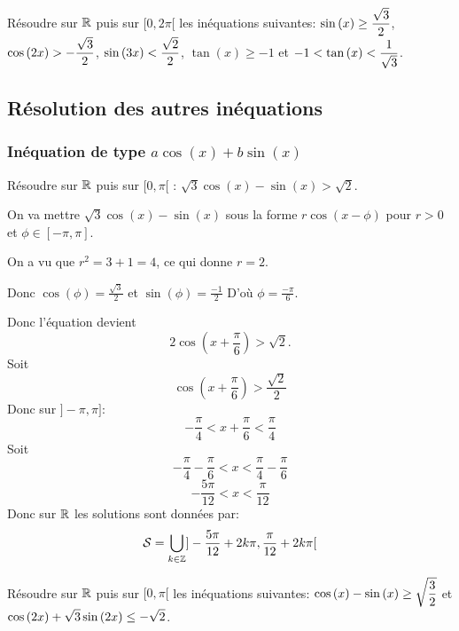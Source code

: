 \documentclass[a4paper, 11pt]{article}
\begin{document}
{\footnotesize
\begin{exo} R\'esoudre sur $\mathbb{R}$ puis sur $\lbrack 0,2\pi\lbrack$ les in\'equations suivantes:  $\displaystyle \sin{(x)}\geq \frac{\sqrt{3}}{2}$, $\displaystyle \cos{(2x)}>-\frac{\sqrt{3}}{2}$, $\displaystyle \sin{(3x)}<\frac{\sqrt{2}}{2}$, $\tan{(x)}\geq -1$ et $\displaystyle -1<\tan{(x)}<\frac{1}{\sqrt{3}}$.
\end{exo}}


\subsection{R\'esolution des autres in\'equations}


\subsubsection{In\'equation de type $a\cos{(x)}+b\sin{(x)}$}

\begin{exemple}
R\'esoudre sur $\mathbb{R}$ puis sur $\lbrack 0,\pi\lbrack$ : $\sqrt{3}\cos{(x)}-\sin{(x)}>\sqrt{2}$.

\end{exemple}
\begin{cor}
On va mettre $\sqrt{3}\cos{(x)}-\sin{(x)}$ sous la forme $r\cos(x-\phi)$ pour $r>0$ et $\phi\in [-\pi,\pi]$. 

On a vu que $r^2= 3+1=4$, ce qui donne $r=2$. 

Donc $\cos(\phi) =\frac{\sqrt{3}}{2}$ et $\sin(\phi) = \frac{-1}{2} $ 
D'où $\phi=\frac{-\pi}{6}$.

Donc l'équation devient $$2 \cos(x+\frac{\pi}{6}) >\sqrt{2}.$$
Soit 
$$\cos(x+\frac{\pi}{6}) >\frac{\sqrt{2}}{2}$$
Donc  sur $]-\pi, \pi]$:
$$-\frac{\pi}{4}< x+\frac{\pi}{6} <\frac{\pi}{4}$$
Soit 
$$-\frac{\pi}{4}-\frac{\pi}{6} < x <\frac{\pi}{4}-\frac{\pi}{6} $$
$$-\frac{5\pi}{12} < x <\frac{\pi}{12} $$
Donc sur $\mathbb{R}$ les solutions sont données par:
$$\mathcal{S}=\bigcup_{k\in \mathbb{Z}} ]-\frac{5\pi}{12}+2k\pi , \frac{\pi}{12} +2k\pi[$$


\end{cor}


{\footnotesize
\begin{exo} R\'esoudre sur $\mathbb{R}$ puis sur $\lbrack 0,\pi\lbrack$ les in\'equations suivantes: $\displaystyle \cos{(x)}-\sin{(x)}\geq \sqrt{\frac{3}{2}}$ et \noindent $\displaystyle \cos{(2x)}+\sqrt{3}\sin{(2x)}\leq -\sqrt{2}$.
\end{exo}}
\end{document}
